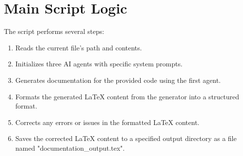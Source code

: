 \documentclass{article}
\begin{document}
\section*{Main Script Logic}
The script performs several steps:
\begin{enumerate}
    \item Reads the current file's path and contents.
    \item Initializes three AI agents with specific system prompts.
    \item Generates documentation for the provided code using the first agent.
    \item Formats the generated LaTeX content from the generator into a structured format.
    \item Corrects any errors or issues in the formatted LaTeX content.
    \item Saves the corrected LaTeX content to a specified output directory as a file named "documentation\_output.tex".
\end{enumerate}
\end{document}
